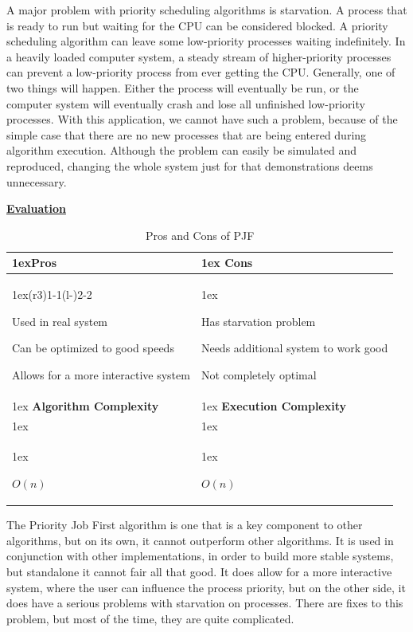 \documentclass{article}
\begin{document}
A major problem with priority scheduling algorithms is starvation. A process that is ready to run but waiting for the CPU can be considered blocked. A priority scheduling algorithm can leave some low-priority processes waiting indefinitely. In a heavily loaded computer system, a steady stream of higher-priority processes can prevent a low-priority process from ever getting the CPU. Generally, one of two things will happen. Either the process will eventually be run, or the computer system will eventually crash and lose all unfinished low-priority processes. With this application, we cannot have such a problem, because of the simple case that there are no new processes that are being entered during algorithm execution. Although the problem can easily be simulated and reproduced, changing the whole system just for that demonstrations deems unnecessary.

\bigskip

\underline{\textbf{Evaluation}}

\begin{table}[H]
  \begin{tabularx}{\linewidth}{>{\parskip1ex}X@{\kern4\tabcolsep}>{\parskip1ex}X}
    \toprule
    \hfil\bfseries Pros & \hfil\bfseries Cons \\
    \cmidrule(r{3\tabcolsep}){1-1}\cmidrule(l{-\tabcolsep}){2-2}

    Used in real system\par
    Can be optimized to good speeds\par
    Allows for a more interactive system\par

    &

    Has starvation problem\par
    Needs additional system to work good\par
    Not completely optimal \\
    \bottomrule
    \toprule
    \hfil\bfseries Algorithm Complexity & \hfil\bfseries Execution Complexity \\

    \\
    \centerline{$O(n)$}\par

    &

    \centerline{$O(n)$}
  \end{tabularx}
  \caption{Pros and Cons of PJF}
\end{table}

The Priority Job First algorithm is one that is a key component to other algorithms, but on its own, it cannot outperform other algorithms. It is used in conjunction with other implementations, in order to build more stable systems, but standalone it cannot fair all that good. It does allow for a more interactive system, where the user can influence the process priority, but on the other side, it does have a serious problems with starvation on processes. There are fixes to this problem, but most of the time, they are quite complicated.
\end{document}
